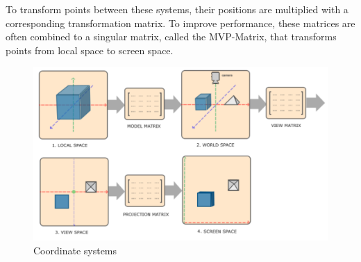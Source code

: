To transform points between these systems, their positions are multiplied with a corresponding transformation matrix.
To improve performance, these matrices are often combined to a singular matrix, called the MVP-Matrix,
that transforms points from local space to screen space. \cite{de_vries_learn_2020}

\begin{figure}[h!]
    \centering
    \includegraphics[width=0.85\linewidth]{images/coordinateSystemsAdjusted}
    \caption{Coordinate systems}
    \label{fig:coordinate-systems}
\end{figure}

